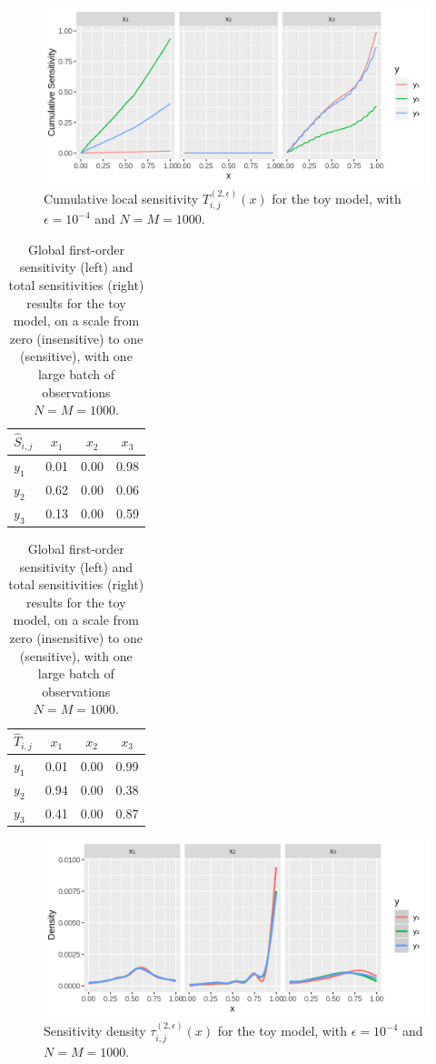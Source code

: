 \documentclass[12pt]{article}
\begin{document}
\begin{figure}
    \centering
    \includegraphics[width=1.00\linewidth]{figures/toy-tx.png}
    \caption{Cumulative local sensitivity $T_{i,j}^{(2,\epsilon)}(x)$ for the toy model, with $\epsilon = 10^{-4}$ and $N = M = 1000$.}
    \label{fig:toy-tx}
\end{figure}

\begin{table}
\centering
\begin{tabular}{l|c|c|c}
$\hat{S}_{i,j}$ & $x_1$ & $x_2$ & $x_3$ \\
\hline
$y_1$ & 0.01 & 0.00 & 0.98 \\
$y_2$ & 0.62 & 0.00 & 0.06 \\
$y_3$ & 0.13 & 0.00 & 0.59 \\
\end{tabular}
\quad
\begin{tabular}{l|c|c|c}
$\hat{T}_{i,j}$ & $x_1$ & $x_2$ & $x_3$ \\
\hline
$y_1$ & 0.01 & 0.00 & 0.99 \\
$y_2$ & 0.94 & 0.00 & 0.38 \\
$y_3$ & 0.41 & 0.00 & 0.87 \\
\end{tabular}
\caption{Global first-order sensitivity (left) and total sensitivities (right) results for the toy model, on a scale from zero (insensitive) to one (sensitive), with one large batch of observations $N = M = 1000$.}
\label{tab:toyglobal}
\end{table}

\begin{figure}
    \centering
    \includegraphics[width=1.00\linewidth]{figures/toy-tau.png}
    \caption{Sensitivity density $\tau_{i,j}^{(2,\epsilon)}(x)$ for the toy model, with $\epsilon = 10^{-4}$ and $N = M = 1000$.}
    \label{fig:toy-tau}
\end{figure}
\end{document}
